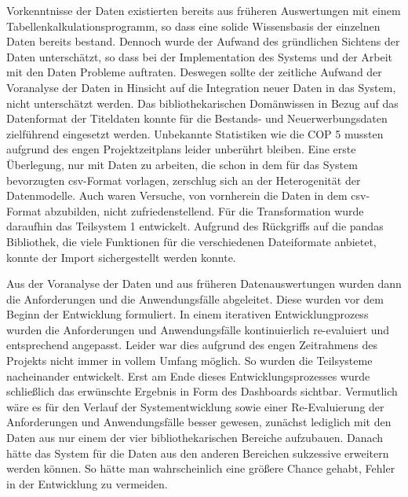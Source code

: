 Vorkenntnisse der Daten existierten bereits aus früheren Auswertungen mit einem Tabellenkalkulationsprogramm, so dass eine solide Wissensbasis 
der einzelnen Daten bereits bestand. Dennoch wurde der Aufwand des gründlichen Sichtens der Daten unterschätzt, so dass bei 
der Implementation des Systems und der Arbeit mit den Daten Probleme auftraten. Deswegen sollte der zeitliche Aufwand der Voranalyse der Daten in Hinsicht auf die Integration neuer
Daten in das System, nicht unterschätzt werden. Das bibliothekarischen Domänwissen in Bezug auf das Datenformat der Titeldaten konnte
für die Bestands- und Neuerwerbungsdaten zielführend eingesetzt werden. Unbekannte Statistiken wie die \acrlong{COP 5} mussten aufgrund des engen Projektzeitplans leider unberührt bleiben.
Eine erste Überlegung, nur mit Daten zu arbeiten, die schon in dem für das System bevorzugten csv-Format vorlagen, 
zerschlug sich an der Heterogenität der Datenmodelle. Auch waren Versuche, von vornherein die Daten in dem csv-Format abzubilden, nicht zufriedenstellend.
Für die Transformation wurde daraufhin das Teilsystem 1 entwickelt.
Aufgrund des Rückgriffs auf die pandas Bibliothek, die viele Funktionen für die verschiedenen Dateiformate anbietet, konnte der Import sichergestellt werden konnte.

Aus der Voranalyse der Daten und aus früheren Datenauswertungen wurden dann die Anforderungen und die Anwendungsfälle abgeleitet.
Diese wurden vor dem Beginn der Entwicklung formuliert. In einem iterativen Entwicklungprozess wurden die Anforderungen und Anwendungsfälle kontinuierlich re-evaluiert und 
entsprechend angepasst. Leider war dies aufgrund des engen Zeitrahmens des Projekts nicht immer in vollem Umfang möglich. So wurden die Teilsysteme nacheinander entwickelt. 
Erst am Ende dieses Entwicklungsprozesses wurde schließlich das erwünschte Ergebnis in Form des Dashboards sichtbar. Vermutlich wäre es für den Verlauf der Systementwicklung sowie einer
Re-Evaluierung der Anforderungen und Anwendungsfälle besser gewesen, zunächst lediglich mit den Daten aus nur einem der vier bibliothekarischen Bereiche
aufzubauen. Danach hätte das System für die Daten aus den anderen Bereichen sukzessive erweitern werden können. 
So hätte man wahrscheinlich eine größere Chance gehabt, Fehler in der Entwicklung zu vermeiden.




